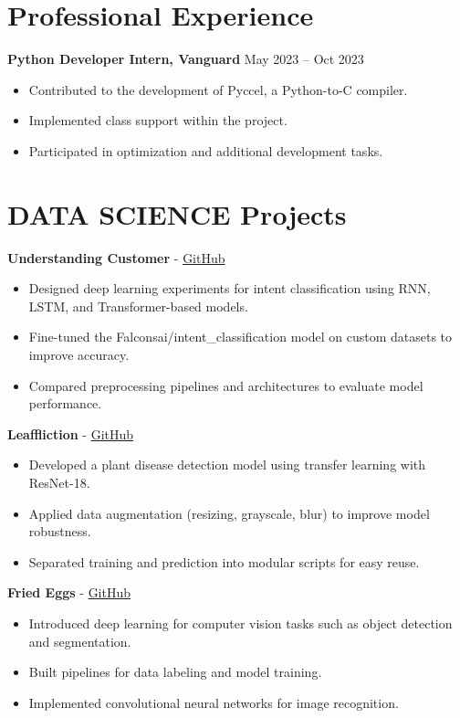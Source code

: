 \documentclass[a4paper,11pt]{article}%
\begin{document}
\section*{Professional Experience}%
\textbf{Python Developer Intern, Vanguard} \hfill May 2023 -- Oct 2023%
\begin{itemize}[leftmargin=*]%
\item Contributed to the development of Pyccel, a Python-to-C compiler.%
\item Implemented class support within the project.%
\item Participated in optimization and additional development tasks.%
\end{itemize}%
\section*{DATA SCIENCE Projects}%
%
\noindent \textbf{Understanding Customer} - \href{https://github.com/sboof911/Understanding-customer}{GitHub}%
\begin{itemize}[leftmargin=2em,label={},parsep=0pt,topsep=1em]%
\item Designed deep learning experiments for intent classification using RNN, LSTM, and Transformer-based models.%
\item Fine-tuned the Falconsai/intent\_classification model on custom datasets to improve accuracy.%
\item Compared preprocessing pipelines and architectures to evaluate model performance.%
\end{itemize}%
%
\noindent \textbf{Leaffliction} - \href{https://github.com/sboof911/Leaffliction}{GitHub}%
\begin{itemize}[leftmargin=2em,label={},parsep=0pt,topsep=1em]%
\item Developed a plant disease detection model using transfer learning with ResNet-18.%
\item Applied data augmentation (resizing, grayscale, blur) to improve model robustness.%
\item Separated training and prediction into modular scripts for easy reuse.%
\end{itemize}%
%
\noindent \textbf{Fried Eggs} - \href{https://github.com/sboof911/Fried-eggs}{GitHub}%
\begin{itemize}[leftmargin=2em,label={},parsep=0pt,topsep=1em]%
\item Introduced deep learning for computer vision tasks such as object detection and segmentation.%
\item Built pipelines for data labeling and model training.%
\item Implemented convolutional neural networks for image recognition.%
\end{itemize}%
\end{document}
